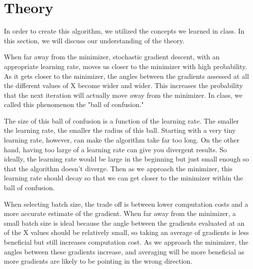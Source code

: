 \documentclass{article}
\begin{document}
\section*{Theory}
\par In order to create this algorithm, we utilized the concepts we learned in class. In this section, we will discuss our understanding of the theory.
\par When far away from the minimizer, stochastic gradient descent, with an appropriate learning rate, moves us closer to the minimizer with high probability. As it gets closer to the minimizer, the angles between the gradients assessed at all the different values of X become wider and wider. This increases the probability that the next iteration will actually move away from the minimizer. In class, we called this phenomenon the "ball of confusion."
\par The size of this ball of confusion is a function of the learning rate. The smaller the learning rate, the smaller the radius of this ball. Starting with a very tiny learning rate, however, can make the algorithm take far too long. On the other hand, having too large of a learning rate can give you divergent results. So ideally, the learning rate would be large in the beginning but just small enough so that the algorithm doesn't diverge. Then as we approach the minimizer, this learning rate should decay so that we can get closer to the minimizer within the ball of confusion.
\par When selecting batch size, the trade off is between lower computation costs and a more accurate estimate of the gradient. When far away from the minimizer, a small batch size is ideal because the angle between the gradients evaluated at an of the X values should be relatively small, so taking an average of gradients is less beneficial but still increases computation cost. As we approach the minimizer, the angles between these gradients increase, and averaging will be more beneficial as more gradients are likely to be pointing in the wrong direction.    
\end{document}
